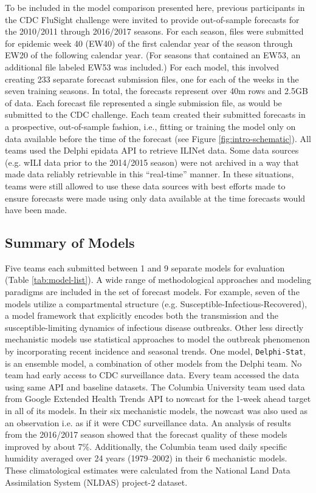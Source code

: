 \documentclass[9pt,twocolumn,twoside]{pnas-new}\usepackage[]{graphicx}\usepackage[]{color}
\begin{document}
{To be included in the model comparison presented here, previous participants in the CDC FluSight challenge were invited to provide out-of-sample forecasts for the 2010/2011 through 2016/2017 seasons.
For each season, files were submitted for epidemic week 40 (EW40) of the first calendar year of the season through EW20 of the following calendar year. 
(For seasons that contained an EW53, an additional file labeled EW53 was included.)
For each model, this involved creating 233 separate forecast submission files, one for each of the weeks in the seven training seasons.
In total, the forecasts represent over 40m rows and 2.5GB of data.
Each forecast file represented a single submission file, as would be submitted to the CDC challenge. 
Each team created their submitted forecasts in a prospective, out-of-sample fashion, i.e., fitting or training the model only on data available before the time of the forecast (see Figure \ref{fig:intro-schematic}). 
All teams used the Delphi epidata API to retrieve ILINet data.\cite{DELPHI}
Some data sources (e.g. wILI data prior to the 2014/2015 season) were not archived in a way that made data reliably retrievable in this ``real-time'' manner. 
In these situations, teams were still allowed to use these data sources with best efforts made to ensure forecasts were made using only data available at the time forecasts would have been made.

\subsection*{Summary of Models}

Five teams each submitted between 1 and 9 separate models for evaluation (Table \ref{tab:model-list}). 
A wide range of methodological approaches and modeling paradigms are included in the set of forecast models.
For example, seven of the models utilize a compartmental structure (e.g. Susceptible-Infectious-Recovered), a model framework that explicitly encodes both the transmission and the susceptible-limiting dynamics of infectious disease outbreaks.
Other less directly mechanistic models use statistical approaches to model the outbreak phenomenon by incorporating recent incidence and seasonal trends.
One model, {\tt Delphi-Stat}, is an ensemble model, a combination of other models from the Delphi team.
No team had early access to CDC surveillance data. Every team accessed the data using same API and baseline datasets.
The Columbia University team used data from Google Extended Health Trends API to nowcast for the 1-week ahead target in all of its models. In their six mechanistic models, the nowcast was also used as an observation i.e. as if it were CDC surveillance data. An analysis of results from the 2016/2017 season showed that the forecast quality of these models improved by about 7\%.\cite{Kandula2018} 
Additionally, the Columbia team used daily specific humidity averaged over 24 years (1979–2002) in their 6 mechanistic models. These climatological estimates were calculated from the National Land Data Assimilation System (NLDAS) project-2 dataset.

}
\end{document}
